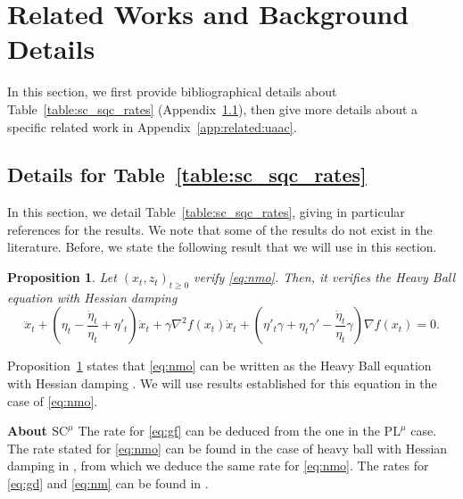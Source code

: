 \documentclass{article}
\newcommand{\jh}[1]{{\color{red} #1}}
\def\xz{(x_t,z_t)_{t\ge 0}}
\def\pl{{\text{PL}^\mu}}
\newcommand{\bpar}[1]{\left(#1\right)}
\newcommand{\strongconv}{\text{SC}^{\mu}}
\theoremstyle{plain}
\newtheorem{proposition}[theorem]{Proposition}
\theoremstyle{definition}
\theoremstyle{remark}
\begin{document}
\section{Related Works and Background Details}
In this section, we first provide bibliographical details about Table~\ref{table:sc_sqc_rates} (Appendix~\ref{app:related_work_tab}), then give more details about a specific related work in Appendix~\ref{app:related:uaac}.

\subsection{Details for Table~\ref{table:sc_sqc_rates}}\label{app:related_work_tab}
In this section, we detail Table~\ref{table:sc_sqc_rates}, giving in particular references for the results. We note that some of the results do not exist in the literature. Before, we state the following result that we will use in this section.
\begin{proposition}\label{prop:equiv_hb_nmo}
    Let $\xz$ verify \eqref{eq:nmo}. Then, it verifies the Heavy Ball equation with Hessian damping
    \begin{equation}
    \ddot{x}_t
    + \bpar{\eta_t - \frac{\dot{\eta}_t}{\eta_t} + \eta'_t }\dot{x}_t
    + \gamma \nabla^2 f(x_t)\dot{x}_t
    + \bpar{ \eta'_t \gamma + \eta_t \gamma' -\frac{\dot{\eta}_t}{\eta_t}\gamma }\nabla f(x_t)
    = 0.
\end{equation}
\end{proposition}
Proposition~\ref{prop:equiv_hb_nmo} states that \eqref{eq:nmo} can be written as the Heavy Ball equation with Hessian damping \cite{alvarez2002second}. We will use results established for this equation in the case of \eqref{eq:nmo}.


\textbf{About $\strongconv$ \:} The rate for \eqref{eq:gf} can be deduced from the one in the $\pl$ case. The rate stated for \eqref{eq:nmo} can be found in the case of heavy ball with Hessian damping in \cite{shi2018understanding}, from which we deduce the same rate for \eqref{eq:nmo}.  The rates for \eqref{eq:gd} and \eqref{eq:nm} can be found in \cite{nesterovbook}.
\end{document}
